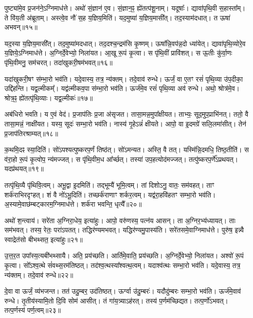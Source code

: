 पुष्ट्या॑मे॒व प्र॒जन॑ने॒\-ऽग्निमाध॑त्ते।
अथो॑ सं॒ज्ञान॑ ए॒व।
सं॒ज्ञान॒ꣴ॒ ह्ये॑तत्प॑शू॒नाम्।
यदूषाः᳚।
द्यावा॑पृथि॒वी स॒हास्ता᳚म्।
ते वि॑य॒ती अ॑ब्रूताम्।
अस्त्वे॒व नौ॑ स॒ह य॒ज्ञिय॒मिति॑।
यद॒मुष्या॑ य॒ज्ञिय॒मासी᳚त्।
तद॒स्याम॑दधात्।
त ऊषा॑ अभवन्॥१५॥

यद॒स्या य॒ज्ञिय॒मासी᳚त्।
तद॒मुष्या॑मदधात्।
तद॒दश्च॒न्द्रम॑सि कृ॒ष्णम्।
ऊषा᳚न्नि॒वप॑न्न॒दो ध्या॑येत्।
द्यावा॑पृथि॒व्योरे॒व य॒ज्ञिये॒\-ऽग्निमाध॑त्ते।
अ॒ग्निर्दे॒वेभ्यो॒ निला॑यत।
आ॒खू रू॒पं कृ॒त्वा।
स पृ॑थि॒वीं प्रावि॑शत्।
स ऊ॒तीः कु॑र्वा॒णः पृ॑थि॒वीमनु॒ सम॑चरत्।
तदा॑खुकरी॒षम॑भवत्॥१६॥

यदा॑खुकरी॒षꣳ स॑म्भा॒रो भव॑ति।
यदे॒वास्य॒ तत्र॒ न्य॑क्तम्।
तदे॒वाव॑ रुन्धे।
ऊर्जं॒ वा ए॒तꣳ रसं॑ पृथि॒व्या उ॑प॒दीका॒ उद्दि॑हन्ति।
यद्व॒ल्मीकम्᳚।
यद्व॑ल्मीकव॒पा स॑म्भा॒रो भव॑ति।
ऊर्ज॑मे॒व रसं॑ पृथि॒व्या अव॑ रुन्धे।
अथो॒ श्रोत्र॑मे॒व।
श्रोत्र॒ꣴ॒ ह्ये॑तत्पृ॑थि॒व्याः।
यद्व॒ल्मीकः॑॥१७॥

अब॑धिरो भवति।
य ए॒वं वेद॑।
प्र॒जा\-प॑तिः प्र॒जा अ॑\-सृजत।
तासा॒मन्न॒मुपा᳚क्षीयत।
ताभ्यः॒ सूद॒मुप॒प्राभि॑नत्।
ततो॒ वै तासा॒मन्नं॒ नाक्षी॑यत।
यस्य॒ सूदः॑ सम्भा॒रो भव॑ति।
नास्य॑ गृ॒हेऽन्नं॑ क्षीयते।
आपो॒ वा इ॒दमग्रे॑ सलि॒लमा॑सीत्।
तेन॑ प्र॒जा\-प॑तिरश्राम्यत्॥१८॥

क॒थमि॒दꣴ स्या॒दिति॑।
सो॑ऽपश्यत्पुष्करप॒र्णं तिष्ठ॑त्।
सो॑ऽमन्यत।
अस्ति॒ वै तत्।
यस्मि॑न्नि॒दमधि॒ तिष्ठ॒तीति॑।
स व॑रा॒हो रू॒पं कृ॒त्वोप॒ न्य॑मज्जत्।
स पृ॑थि॒वीम॒ध आ᳚र्च्छत्।
तस्या॑ उप॒हत्योद॑मज्जत्।
तत्पु॑ष्करप॒र्णे᳚\-ऽप्रथयत्।
यदप्र॑थयत्॥१९॥

तत्पृ॑थि॒व्यै पृ॑थिवि॒त्वम्।
अभू॒द्वा इ॒दमिति॑।
तद्भूम्यै॑ भूमि॒त्वम्।
तां दिशोऽनु॒ वातः॒ सम॑वहत्।
ताꣳ शर्क॑राभिरदृꣳहत्।
शं वै नो॑ऽभू॒दिति॑।
तच्छर्क॑राणाꣳ शर्कर॒त्वम्।
यद्व॑रा॒हवि॑हतꣳ सम्भा॒रो भव॑ति।
अ॒स्यामे॒वा\-छ॑म्बट्कारम॒ग्निमाध॑त्ते।
शर्क॑रा भवन्ति॒ धृत्यै᳚॥२०॥

अथो॑ श॒न्त्वाय॑।
सरे॑ता अ॒ग्निरा॒धेय॒ इत्या॑हुः।
आपो॒ वरु॑णस्य॒ पत्न॑य आसन्।
ता अ॒ग्निर॒भ्य॑ध्यायत्।
ताः सम॑भवत्।
तस्य॒ रेतः॒ परा॑ऽपतत्।
तद्धिर॑ण्यमभवत्।
यद्धिर॑ण्यमु॒पास्य॑ति।
सरे॑तसमे॒वाग्निमाध॑त्ते।
पुरु॑ष॒ इन्न्वै स्वाद्रेत॑सो बीभथ्सत॒ इत्या॑हुः॥२१॥

उ॒त्त॒र॒त उपा᳚स्य॒त्यबी॑भथ्सायै।
अति॒ प्रय॑च्छति।
आर्ति॑मे॒वाति॒ प्रय॑च्छति।
अ॒ग्निर्दे॒वेभ्यो॒ निला॑यत।
अश्वो॑ रू॒पं कृ॒त्वा।
सो᳚ऽश्व॒त्थे सं॑वथ्स॒रम॑तिष्ठत्।
तद॑श्व॒त्थस्या᳚श्वत्थ॒त्वम्।
यदाश्व॑त्थः सम्भा॒रो भव॑ति।
यदे॒वास्य॒ तत्र॒ न्य॑क्तम्।
तदे॒वाव॑ रुन्धे॥२२॥

दे॒वा वा ऊर्जं॒ व्य॑भजन्त।
तत॑ उदु॒म्बर॒ उद॑तिष्ठत्।
ऊर्ग्वा उ॑दु॒म्बरः॑।
यदौदु॑म्बरः सम्भा॒रो भव॑ति।
ऊर्ज॑मे॒वाव॑ रुन्धे।
तृ॒तीय॑स्यामि॒तो दि॒वि सोम॑ आसीत्।
तं गा॑य॒त्र्या\-ऽह॑रत्।
तस्य॑ प॒र्णम॑च्छिद्यत।
तत्प॒र्णो॑\-ऽभवत्।
तत्प॒र्णस्य॑ पर्ण॒त्वम्॥२३॥

